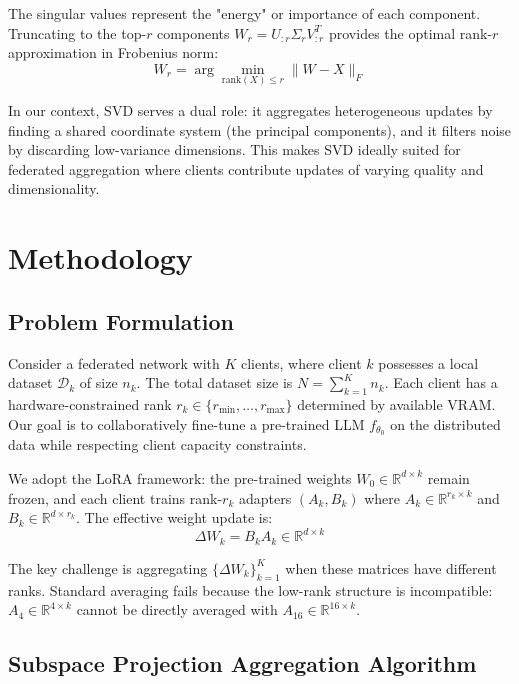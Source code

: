 \documentclass[conference]{IEEEtran}
\begin{document}
The singular values represent the "energy" or importance of each component. Truncating to the top-$r$ components $W_r = U_{:r} \Sigma_{r} V^T_{:r}$ provides the optimal rank-$r$ approximation in Frobenius norm:
\begin{equation}
W_r = \arg\min_{\text{rank}(X) \leq r} \|W - X\|_F
\end{equation}

In our context, SVD serves a dual role: it aggregates heterogeneous updates by finding a shared coordinate system (the principal components), and it filters noise by discarding low-variance dimensions. This makes SVD ideally suited for federated aggregation where clients contribute updates of varying quality and dimensionality.

\section{Methodology}
\label{sec:methodology}

\subsection{Problem Formulation}

Consider a federated network with $K$ clients, where client $k$ possesses a local dataset $\mathcal{D}_k$ of size $n_k$. The total dataset size is $N = \sum_{k=1}^K n_k$. Each client has a hardware-constrained rank $r_k \in \{r_{\min}, \ldots, r_{\max}\}$ determined by available VRAM. Our goal is to collaboratively fine-tune a pre-trained LLM $f_{\theta_0}$ on the distributed data while respecting client capacity constraints.

We adopt the LoRA framework: the pre-trained weights $W_0 \in \mathbb{R}^{d \times k}$ remain frozen, and each client trains rank-$r_k$ adapters $(A_k, B_k)$ where $A_k \in \mathbb{R}^{r_k \times k}$ and $B_k \in \mathbb{R}^{d \times r_k}$. The effective weight update is:
\begin{equation}
\Delta W_k = B_k A_k \in \mathbb{R}^{d \times k}
\end{equation}

The key challenge is aggregating $\{\Delta W_k\}_{k=1}^K$ when these matrices have different ranks. Standard averaging fails because the low-rank structure is incompatible: $A_4 \in \mathbb{R}^{4 \times k}$ cannot be directly averaged with $A_{16} \in \mathbb{R}^{16 \times k}$.

\subsection{Subspace Projection Aggregation Algorithm}
\end{document}
